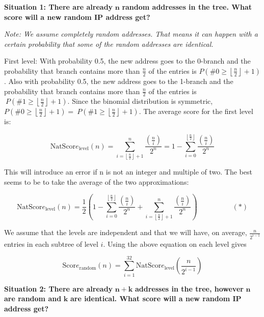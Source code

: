 \appendix

\textbf{Situation 1: There are already} \(\mathbf{n}\) \textbf{random
addresses in the tree. What score will a new random IP address get?}

\emph{Note: We assume completely random addresses. That means it can
happen with a certain probability that some of the random addresses are
identical.}

First level: With probability 0.5, the new address goes to the 0-branch
and the probability that branch contains more than \(\frac{n}{2}\) of
the entries is
\(P(\# 0 \geq \left\lfloor \frac{n}{2} \right\rfloor + 1)\). Also with
probability 0.5, the new address goes to the 1-branch and the
probability that branch contains more than \(\frac{n}{2}\) of the
entries is\(\ P(\# 1 \geq \left\lfloor \frac{n}{2} \right\rfloor + 1).\)
Since the binomial distribution is symmetric,
\(P\left( \# 0 \geq \left\lfloor \frac{n}{2} \right\rfloor + 1 \right) = \ P(\# 1 \geq \left\lfloor \frac{n}{2} \right\rfloor + 1)\).
The average score for the first level is:

\[\text{NatScor}e_{\text{level}}(n) = \sum_{i = \left\lfloor \frac{n}{2} \right\rfloor + 1}^{n}\frac{\left( \frac{n}{i} \right)}{2^{n}} = 1 - \sum_{i = 0}^{\left\lfloor \frac{n}{2} \right\rfloor}\frac{\left( \frac{n}{i} \right)}{2^{n}}\]

This will introduce an error if n is not an integer and multiple of two.
The best seems to be to take the average of the two approximations:

\[\text{NatScor}e_{\text{level}}(n) = \frac{1}{2}\left( 1 - \sum_{i = 0}^{\left\lfloor \frac{n}{2} \right\rfloor}\frac{\left( \frac{n}{i} \right)}{2^{n}} + \sum_{i = \left\lfloor \frac{n}{2} \right\rfloor + 1}^{n}\frac{\left( \frac{n}{i} \right)}{2^{n}} \right)\ \ \ \ \ \ \ \ \ \ \ \ \ \ \ \ \ \ \ \ \ \ (*)\]

We assume that the levels are independent and that we will have, on
average, \(\frac{n}{2^{i - 1}}\) entries in each subtree of level \(i\).
Using the above equation on each level gives

\[\text{Scor}e_{\text{random}}(n) = \sum_{i = 1}^{32}{\text{NatScor}e_{\text{level}}\left( \frac{n}{2^{i - 1}} \right)}\]

\textbf{\hfill\break
}

\textbf{Situation 2: There are already} \(\mathbf{n + k}\)
\textbf{addresses in the tree, however} \(\mathbf{n}\) \textbf{are
random and} \(\mathbf{k}\) \textbf{are identical. What score will a new
random IP address get?}

